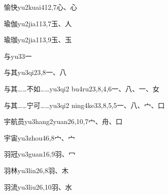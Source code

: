 \begin{entry}{愉快}{yu2kuai4}{12,7}{⼼、⼼}
\end{entry}

\begin{entry}{瑜伽}{yu2jia1}{13,7}{⽟、⼈}
\end{entry}

\begin{entry}{瑜珈}{yu2jia1}{13,9}{⽟、⽟}
\end{entry}

\begin{entry}{与}{yu3}{3}{⼀}
\end{entry}

\begin{entry}{与其}{yu3qi2}{3,8}{⼀、⼋}
\end{entry}

\begin{entry}{与其……不如……}{yu3qi2 bu4ru2}{3,8,4,6}{⼀、⼋、⼀、⼥}
\end{entry}

\begin{entry}{与其……宁可……}{yu3qi2 ning4ke3}{3,8,5,5}{⼀、⼋、⼧、⼝}
\end{entry}

\begin{entry}{宇航员}{yu3hang2yuan2}{6,10,7}{⼧、⾈、⼝}
\end{entry}

\begin{entry}{宇宙}{yu3zhou4}{6,8}{⼧、⼧}
\end{entry}

\begin{entry}{羽冠}{yu3guan1}{6,9}{⽻、⼍}
\end{entry}

\begin{entry}{羽林}{yu3lin2}{6,8}{⽻、⽊}
\end{entry}

\begin{entry}{羽流}{yu3liu2}{6,10}{⽻、⽔}
\end{entry}

